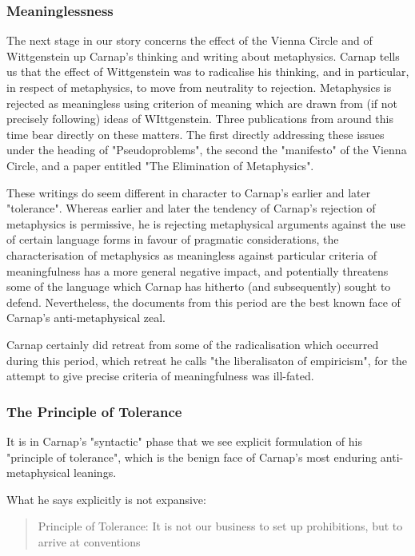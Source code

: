 \documentclass[10pt,titlepage]{book}
\begin{document}
\subsubsection{Meaninglessness}

The next stage in our story concerns the effect of the Vienna Circle and of Wittgenstein up Carnap's thinking and writing about metaphysics.  Carnap tells us that the effect of Wittgenstein was to radicalise his thinking, and in particular, in respect of metaphysics, to move from neutrality to rejection.  Metaphysics is rejected as meaningless using criterion of meaning which are drawn from (if not precisely following) ideas of WIttgenstein.  Three publications from around this time bear directly on these matters. The first directly addressing these issues under the heading of "Pseudoproblems", the second the "manifesto" of the Vienna Circle, and a paper entitled "The Elimination of Metaphysics".

These writings do seem different in character to Carnap's earlier and later "tolerance".  Whereas earlier and later the tendency of Carnap's rejection of metaphysics is permissive, he is rejecting metaphysical arguments against the use of certain language forms in favour of pragmatic considerations, the characterisation of metaphysics as meaningless against particular criteria of meaningfulness has a more general negative impact, and potentially threatens some of the language which Carnap has hitherto (and subsequently) sought to defend.  Nevertheless, the documents from this period are the best known face of Carnap's anti-metaphysical zeal.

Carnap certainly did retreat from some of the radicalisation which occurred during this period, which retreat he calls "the liberalisaton of empiricism", for the attempt to give precise criteria of meaningfulness was ill-fated. 

\subsubsection{The Principle of Tolerance}

It is in Carnap's "syntactic" phase that we see explicit formulation of his "principle of tolerance", which is the benign face of Carnap's most enduring anti-metaphysical leanings.

What he says explicitly is not expansive:
\begin{quote}
Principle of Tolerance: It is not our business to set up prohibitions, but to arrive at conventions
\end{quote}
\end{document}

